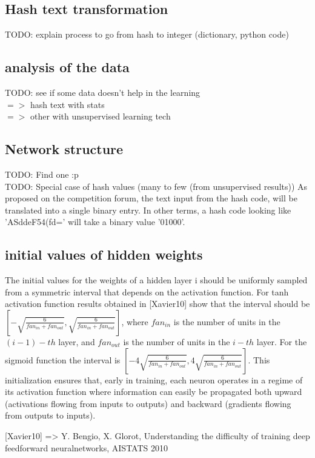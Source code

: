 	\subsection{Hash text transformation}
		TODO: explain process to go from hash to integer (dictionary, python code)


	\subsection{analysis of the data}
		TODO: see if some data doesn't help in the learning \\
		$=>$ hash text with stats\\
		$=>$ other with unsupervised learning tech

	\subsection{Network structure}
		TODO: Find one :p \\

		TODO: Special case of hash values (many to few (from unsupervised results))
		As proposed on the competition forum, the text input from the hash code, will be translated into a single binary entry. In other terms, a hash code looking like 'ASddeF54(fd=' will take a binary value '01000'. 



	\subsection{initial values of hidden weights}

		The initial values for the weights of a hidden layer i should be uniformly sampled from a symmetric interval that depends on the activation function. For tanh activation function results obtained in [Xavier10] show that the interval should be 
		$[-\sqrt{\frac{6}{fan_{in}+fan_{out}}},\sqrt{\frac{6}{fan_{in}+fan_{out}}}] $,
		where $fan_{in}$ is the number of units in the $(i-1)-th$ layer, and $fan_{out}$ is the number of units in the $i-th$ layer. For the sigmoid function the interval is $[-4\sqrt{\frac{6}{fan_{in}+fan_{out}}},4\sqrt{\frac{6}{fan_{in}+fan_{out}}}]$.
		This initialization ensures that, early in training, each neuron operates in a regime of its activation function where information can easily be propagated both upward (activations flowing from inputs to outputs) and backward (gradients flowing from outputs to inputs).

		[Xavier10] => Y. Bengio, X. Glorot, Understanding the difficulty of training deep feedforward neuralnetworks, AISTATS 2010

